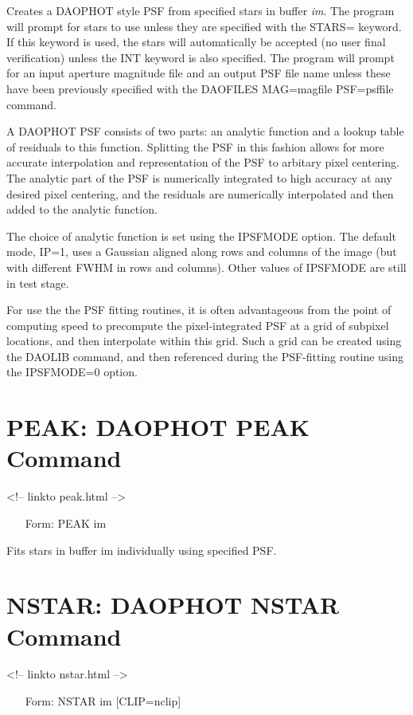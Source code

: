 Creates a DAOPHOT style PSF from specified stars in buffer \textit{im}. 
The program
will prompt for stars to use unless they are specified with the STARS=
keyword. If this keyword is used, the stars will automatically be accepted
(no user final verification) unless the INT keyword is also
specified. The program will prompt for an input aperture magnitude file and
an output PSF file name unless these have been previously specified with
the DAOFILES MAG=magfile PSF=psffile command.

A DAOPHOT PSF consists of two parts: an analytic function and a lookup
table of residuals to this function. Splitting the PSF in this fashion allows
for more accurate interpolation and representation of the PSF to arbitary
pixel centering. The analytic part of the PSF is numerically integrated to
high accuracy at any desired pixel centering, and the residuals are 
numerically interpolated and then added to the analytic function.

The choice of analytic function is set using the IPSFMODE option. The default
mode, IP=1, uses a Gaussian aligned along rows and columns of the image (but
with different FWHM in rows and columns). Other values of IPSFMODE are still
in test stage.

For use the the PSF fitting routines, it is often advantageous from the point
of computing speed to precompute the pixel-integrated PSF at a grid of 
subpixel locations, and then interpolate within this grid. Such a grid
can be created using the DAOLIB command, and then referenced during the
PSF-fitting routine using the IPSFMODE=0 option.

\section{PEAK: DAOPHOT PEAK Command} 
\begin{rawhtml}
<!-- linkto peak.html -->
\end{rawhtml}
\begin{itemize} 
  \item[Form: PEAK im\hfill]{} \end{itemize}

Fits stars in buffer im individually using specified PSF.

\section{NSTAR: DAOPHOT NSTAR Command}
\begin{rawhtml}
<!-- linkto nstar.html -->
\end{rawhtml}
\begin{itemize}
  \item[Form: NSTAR im  {[CLIP=nclip]}\hfill]{}
\end{itemize}

